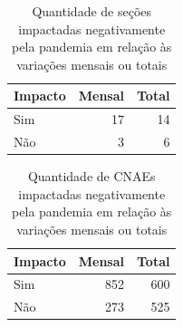 \begin{table}[htb]
\centering
\caption{Quantidade de seções impactadas negativamente pela pandemia em relação às variações mensais ou totais}
\label{tab:pandemia:impacto-por-secao}
    \begin{tabular}{l|r|r}
        \toprule
        Impacto & Mensal & Total \\
        \midrule
        Sim & 17 & 14 \\
        Não &  3 &  6 \\
        \bottomrule
    \end{tabular}
\fdadospesquisa
\end{table}

\begin{table}[htb]
\centering
\caption{Quantidade de CNAEs impactadas negativamente pela pandemia em relação às variações mensais ou totais}
\label{tab:pandemia:impacto-por-cnae}
    \begin{tabular}{l|r|r}
        \toprule
        Impacto & Mensal & Total \\
        \midrule
        Sim & 852 & 600 \\
        Não & 273 & 525 \\
        \bottomrule
    \end{tabular}
\fdadospesquisa
\end{table}
